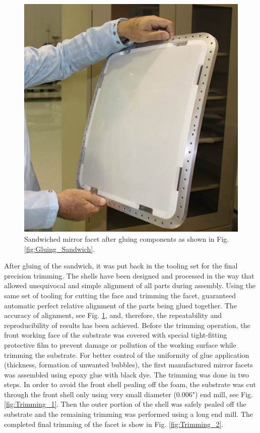\begin{figure}[ht]
    \centering
    \includegraphics[width=0.9\linewidth]{images/Assembled_Sandwich.jpg}
    \caption{Sandwiched mirror facet after gluing components as shown in Fig. \ref{fig:Gluing_Sandwich}.}
    \label{fig:Assembled_Sandwich}
\end{figure}

After gluing of the sandwich, it was put back in the tooling set for the final precision trimming. The shells have been designed and processed in the way that allowed  unequivocal and simple alignment of all parts during assembly. Using the same set of tooling for cutting the face and trimming the facet, guaranteed automatic perfect relative alignment of the parts being glued together. The accuracy of alignment, see  Fig. \ref{fig:Assembled_Sandwich}, and, therefore, the repeatability and reproducibility of results has been achieved. Before the trimming operation, the front working face of the substrate was covered with special tight-fitting protective film to prevent damage or pollution of the working surface while trimming the substrate. For better control of the uniformity of glue application (thickness, formation of unwanted bubbles), the first manufactured mirror facets was assembled using epoxy glue with black dye. The trimming was done in two steps. In order to avoid the front shell pealing off the foam, the substrate  was cut through the front shell only using very small diameter (0.006") end mill, see Fig. \ref{fig:Trimming_1}. Then the outer portion of the shell was safely pealed off the substrate and the remaining trimming was performed using a long end mill. The completed final trimming of the facet is show in Fig. \ref{fig:Trimming_2}.

